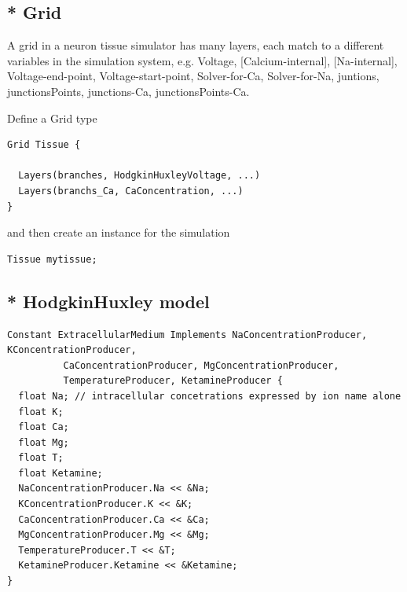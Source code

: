 \subsection{* Grid}

A grid in a neuron tissue simulator has many 
layers, each match to a different variables in the simulation system, e.g.
Voltage, [Calcium-internal], [Na-internal], Voltage-end-point,
Voltage-start-point, Solver-for-Ca, Solver-for-Na, juntions, junctionsPoints,
junctions-Ca, junctionsPoints-Ca.

Define a Grid type
\begin{verbatim}
Grid Tissue {
  
  Layers(branches, HodgkinHuxleyVoltage, ...)
  Layers(branchs_Ca, CaConcentration, ...)
}
\end{verbatim}
and then create an instance for the simulation
\begin{verbatim}
Tissue mytissue;
\end{verbatim}



\subsection{* HodgkinHuxley model}

\begin{verbatim}
Constant ExtracellularMedium Implements NaConcentrationProducer, KConcentrationProducer, 
          CaConcentrationProducer, MgConcentrationProducer,
          TemperatureProducer, KetamineProducer { 
  float Na; // intracellular concetrations expressed by ion name alone
  float K;
  float Ca;
  float Mg;
  float T;
  float Ketamine;
  NaConcentrationProducer.Na << &Na;
  KConcentrationProducer.K << &K;
  CaConcentrationProducer.Ca << &Ca;
  MgConcentrationProducer.Mg << &Mg;
  TemperatureProducer.T << &T;
  KetamineProducer.Ketamine << &Ketamine;
}
\end{verbatim}

